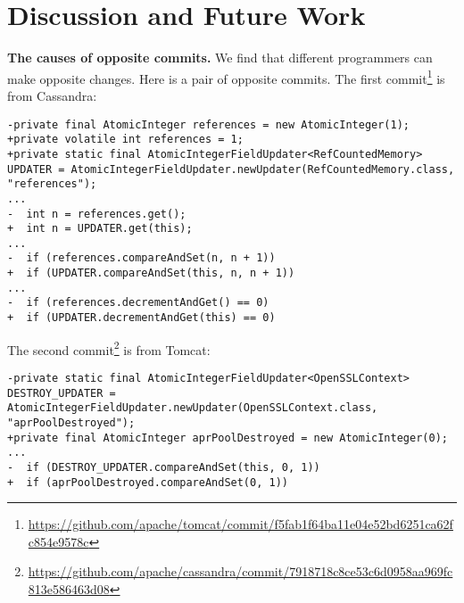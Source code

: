 \section{Discussion and Future Work}
\label{sec:discuss}
%
%
%
%
%
%
%
%

\noindent
\textbf{The causes of opposite commits.} We find that different programmers can make opposite changes. Here is a pair of opposite commits. The first commit\footnote{\url{https://github.com/apache/tomcat/commit/f5fab1f64ba11e04e52bd6251ca62fc854e9578c}} is from Cassandra:

\begin{lstlisting}
-private final AtomicInteger references = new AtomicInteger(1);
+private volatile int references = 1;
+private static final AtomicIntegerFieldUpdater<RefCountedMemory> UPDATER = AtomicIntegerFieldUpdater.newUpdater(RefCountedMemory.class, "references");
...
-  int n = references.get();
+  int n = UPDATER.get(this);
...
-  if (references.compareAndSet(n, n + 1))
+  if (UPDATER.compareAndSet(this, n, n + 1))
...
-  if (references.decrementAndGet() == 0)
+  if (UPDATER.decrementAndGet(this) == 0)
\end{lstlisting}

The second commit\footnote{\url{https://github.com/apache/cassandra/commit/7918718c8ce53c6d0958aa969fc813e586463d08}} is from Tomcat:

\begin{lstlisting}
-private static final AtomicIntegerFieldUpdater<OpenSSLContext> DESTROY_UPDATER = AtomicIntegerFieldUpdater.newUpdater(OpenSSLContext.class, "aprPoolDestroyed");
+private final AtomicInteger aprPoolDestroyed = new AtomicInteger(0);
...
-  if (DESTROY_UPDATER.compareAndSet(this, 0, 1))
+  if (aprPoolDestroyed.compareAndSet(0, 1))
\end{lstlisting}

